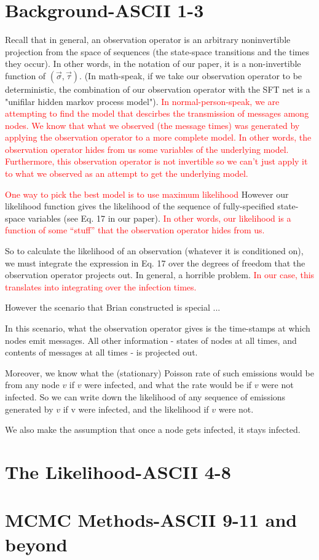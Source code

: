\documentclass{article}
\begin{document}
\section{Background-ASCII 1-3}
Recall that in general, an observation operator is an arbitrary
noninvertible projection from the space of sequences (the state-space
transitions and the times they occur). In other words, in the notation
of our paper, it is a non-invertible function of $(\vec{\sigma},
\vec{\tau})$. (In math-speak, if we take our observation operator to be
deterministic, the combination of our observation operator with the
SFT net is a "unifilar hidden markov process model").  \textcolor{red}{In
normal-person-speak, we are attempting to find the model that descirbes
the transmission of messages among nodes.  We know that what we
observed (the message times) was generated  by applying the observation
operator to a more complete model.  In other words, the observation operator
hides from us some variables of the underlying model.  Furthermore, this
observation operator is not invertible so we can't just apply it to what we observed
as an attempt to get the underlying model.}

\textcolor{red}{One way to pick the best model is to use maximum
likelihood} However our likelihood function gives the likelihood of
the sequence of fully-specified state-space variables (see Eq. 17
in our paper). \textcolor{red}{In other words, our likelihood is a
function of some ``stuff'' that the observation operator hides from us.}

So to calculate the likelihood of an observation (whatever it is
conditioned on), we must integrate the expression in Eq. 17 over the
degrees of freedom that the observation operator projects out. In
general, a horrible problem.  \textcolor{red}{In our case, this translates
into integrating over the infection times.}

However the scenario that Brian constructed is special ...

In this scenario, what the observation operator gives is the
time-stamps at which nodes emit messages. All other information -
states of nodes at all times, and contents of messages at all times -
is projected out.

Moreover, we know what the (stationary) Poisson rate of such emissions
would be from any node $v$ if $v$ were infected, and what the rate would
be if $v$ were not infected. So we can write down the likelihood of any
sequence of emissions generated by $v$ if v were infected, and the
likelihood if $v$ were not.

We also make the assumption that once a node gets infected, it
stays infected.

\section{The Likelihood-ASCII 4-8}




\section{MCMC Methods-ASCII 9-11 and beyond}
\end{document}
